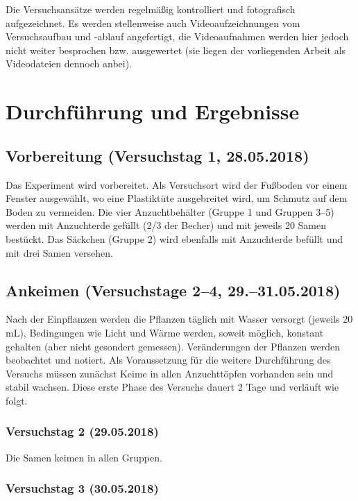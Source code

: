 \documentclass[
11pt, 
ngerman,
listof=totocnumbered,
oneside,
bibliography=totocnumbered,
abstracton
]{scrreprt}
\begin{document}
Die Versuchsansätze werden regelmäßig kontrolliert und fotografisch aufgezeichnet. Es werden stellenweise auch Videoaufzeichnungen vom Versuchsaufbau und -ablauf angefertigt, die Videoaufnahmen werden hier jedoch nicht weiter besprochen bzw. ausgewertet (sie liegen der vorliegenden Arbeit als Videodateien dennoch anbei). 

\section{Durchführung und Ergebnisse}

\subsection{Vorbereitung (Versuchstag 1, 28.05.2018)}

Das Experiment wird vorbereitet. Als Versuchsort wird der Fußboden vor einem Fenster ausgewählt, wo eine Plastiktüte ausgebreitet wird, um Schmutz auf dem Boden zu vermeiden. Die vier Anzuchtbehälter (Gruppe 1 und Gruppen 3--5) werden mit Anzuchterde gefüllt (2/3 der Becher) und mit jeweils 20 Samen bestückt. Das Säckchen (Gruppe 2) wird ebenfalls mit Anzuchterde befüllt und mit drei Samen versehen. 

\subsection{Ankeimen (Versuchstage 2--4, 29.--31.05.2018)}

Nach der Einpflanzen werden die Pflanzen täglich mit Wasser versorgt (jeweils 20 mL), Bedingungen wie Licht und Wärme werden, soweit möglich, konstant gehalten (aber nicht gesondert gemessen). Veränderungen der Pflanzen werden beobachtet und notiert. Als Voraussetzung für die weitere Durchführung des Versuchs müssen zunächst Keime in allen Anzuchttöpfen vorhanden sein und stabil wachsen. Diese erste Phase des Versuchs dauert 2 Tage und verläuft wie folgt. 

\subsubsection{Versuchstag 2 (29.05.2018)} 

Die Samen keimen in allen Gruppen. 

\subsubsection{Versuchstag 3 (30.05.2018)} 
\end{document}
